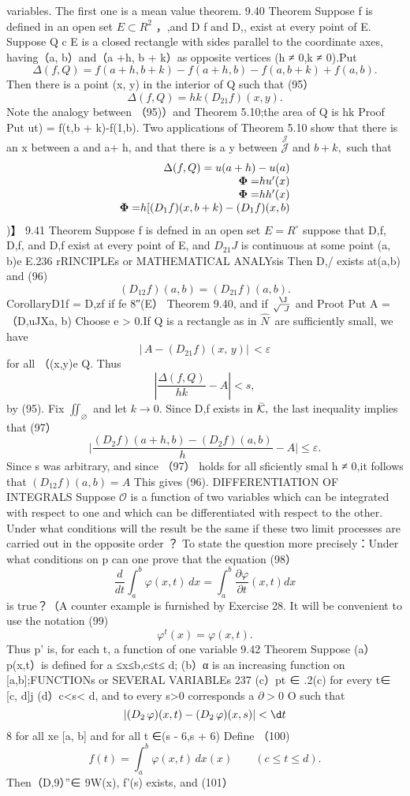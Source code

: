 variables. The first one is a mean value theorem. 9.40 Theorem Suppose f is defined in an open set $E\subset R^{2}$ ，,and D f and D,, exist at every point of E. Suppose Q c E is a closed rectangle with sides parallel to the coordinate axes, having（a, b）and（a +h, b + k）as opposite vertices (h ≠ 0,k ≠ 0).Put $$ \Delta(f,Q)=f(a+h,b+k)-f(a+h,b)-f(a,b+k)+f(a,b). $$ Then there is a point (x, y) in the interior of Q such that (95） $$ \Delta(f,Q)=h k(D_{21}f)(x,y). $$ Note the analogy between （95)）and Theorem 5.10;the area of Q is hk Proof Put ut) = f(t,b + k)-f(1,b). Two applications of Theorem 5.10 show that there is an x between a and a+ h, and that there is a y between $\stackrel{\mathcal{J}}{\mathcal{J}}$ and $b+k,$ such that $$ \begin{array}{r l}{\Delta(f,Q)=u(a+h)-u(a)}\\ {\mathbf{\Phi=}h u^{\prime}(x)}\\ {\mathbf{\Phi=}h h^{\prime}(x)}\\ {\mathbf{\Phi=}h[(D_{1}f)(x,b+k)-(D_{1}f)(x,b)}\end{array} $$ )】 9.41 Theorem Suppose f is defned in an open set $E=R^{\circ}$ suppose that D,f, D,f, and D,f exist at every point of E, and $D_{21}J$ is continuous at some point (a, b)e E.236 rRINCIPLEs or MATHEMATICAL ANALYsis Then D,/ exists at(a,b) and (96) $$ (D_{12}f)(a,b)=(D_{21}f)(a,b). $$ CorollaryD1f = D,zf if fe 8″(E） Theorem 9.40, and if ${\ {\J}\atop{\sqrt{\ J}}}$ and Proot Put A =（D,uJXa, b) Choose e > 0.If Q is a rectangle as in ${\hat{N}}\,$ are sufficiently small, we have $$ |\,A-(D_{21}f)(x,\,y)|\,<\varepsilon $$ for all （(x,y)e Q. Thus $$ \left\vert{\frac{\Delta(f,Q)}{h k}}-A\right\vert<s, $$ by (95). Fix $\textstyle{\iint_{\varnothing}}$ and let $k\to0.$ Since D,f exists in ${\bar{\cal K}},$ the last inequality implies that (97） $$ \Big\vert\frac{(D_{2}f)(a+h,b)-(D_{2}f)(a,b)}{h}-A\Big\vert\leq\varepsilon. $$ Since s was arbitrary, and since （97） holds for all sficiently smal h ≠ 0,it follows that $(D_{12}f)(a,b)=A$ This gives (96). DIFFERENTIATION OF INTEGRALS Suppose ${\mathcal{O}}$ is a function of two variables which can be integrated with respect to one and which can be differentiated with respect to the other. Under what conditions will the result be the same if these two limit processes are carried out in the opposite order ？ To state the question more precisely：Under what conditions on p can one prove that the equation (98） $$ {\frac{d}{d t}}\int_{a}^{b}\!\varphi(x,t)\,d x=\int_{a}^{b}{\frac{\partial\varphi}{\partial t}}\left(x,t\right)d x $$ is true？（A counter example is furnished by Exercise 28. It will be convenient to use the notation (99) $$ \varphi^{t}(x)=\varphi(x,t). $$ Thus p' is, for each t, a function of one variable 9.42 Theorem Suppose (a）p(x,t）is defined for a ≤x≤b,c≤t≤ d; (b）α is an increasing function on [a,b];FUNCTIONs or SEVERAL VARIABLEs 237 (c）pt ∈ .2(c) for every t∈ [c, d]j (d）c<s< d, and to every s>0 corresponds a $\scriptstyle\partial>0$ O such that $$ |(D_{2}\,\varphi)(x,t)-(D_{2}\,\varphi)(x,s)|<\d t $$ 8 for all xe [a, b] and for all t ∈(s - 6,s + 6) Define （100) $$ f(t)=\int_{a}^{b}\!\varphi(x,t)\,d x(x)\qquad(c\leq t\leq d). $$ Then（D,9）”∈ 9W(x), f'(s) exists, and (101） $$ 